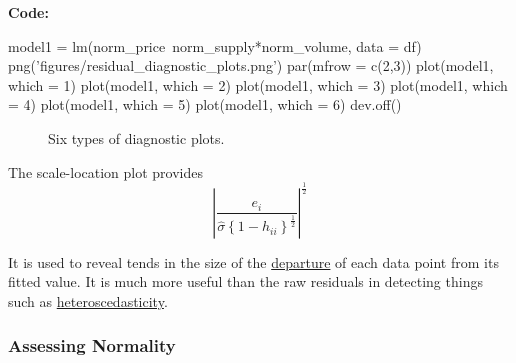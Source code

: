 \documentclass[12pt]{article}
\begin{document}
{\textbf {Code:}}
\begin{rc}
model1 = lm(norm_price~norm_supply*norm_volume, data = df)
png('figures/residual_diagnostic_plots.png')
par(mfrow = c(2,3))
plot(model1, which = 1)
plot(model1, which = 2)
plot(model1, which = 3)
plot(model1, which = 4)
plot(model1, which = 5)
plot(model1, which = 6)
dev.off()
\end{rc}


\begin{figure}[H]
\caption{Six types of diagnostic plots.}
\end{figure}

The scale-location plot provides
\begin{equation*}
\left\lvert 
		\frac{e_{i}}{ \widehat{\sigma}\left\{ 1 - h_{ii} \right\}
		^{\frac{1}{2}} }
\right\rvert ^{\frac{1}{2}}
\end{equation*}

It is used to reveal tends in the size of the {\underline {
departure}} of each data point from its fitted value. It is much more
useful than the raw residuals in detecting things such as
{\underline {heteroscedasticity}}.




\subsubsection{Assessing Normality}
\end{document}
